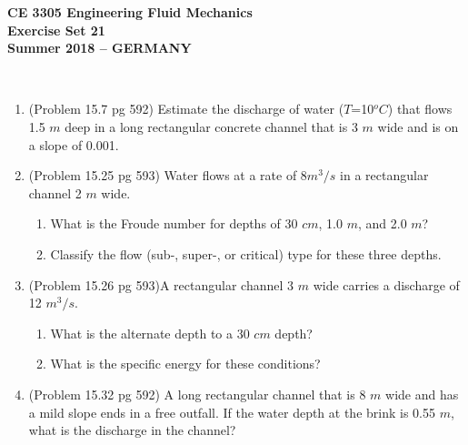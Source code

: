 \documentclass[12pt]{article}
\begin{document}
\begingroup
\begin{center}
{\textbf{{ CE 3305 Engineering Fluid Mechanics} \\ Exercise Set 21 \\ Summer 2018 -- GERMANY} }
\end{center}
\endgroup
\begingroup
~\newline

\begin{enumerate}
\item (Problem 15.7 pg 592) Estimate the discharge of water ($T$=10$^oC$) that flows 1.5 $m$ deep in a long rectangular concrete channel that is 3 $m$ wide and is on a slope of 0.001.

\item(Problem 15.25 pg 593)  Water flows at a rate of 8$m^3/s$ in a rectangular channel 2 $m$ wide.
\begin{enumerate}
\item What is the Froude number for depths of 30 $cm$, 1.0 $m$, and 2.0 $m$?
\item Classify the flow (sub-, super-, or critical) type for these three depths.
\end{enumerate}

\item (Problem 15.26 pg 593)A rectangular channel 3 $m$ wide carries a discharge of 12 $m^3/s$.
\begin{enumerate}
\item What is the alternate depth to a 30 $cm$ depth?
\item What is the specific energy for these conditions?
\end{enumerate}

\item (Problem 15.32 pg 592) A long rectangular channel that is 8 $m$ wide and has a mild slope ends in a free outfall.  If the water depth at the brink is 0.55 $m$, what is the discharge in the channel?

\end{enumerate}
\end{document}
